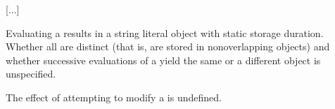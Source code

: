 \documentclass{wg21}
\begin{document}
%
%
%
%

[...]

%
%
%


\pnum
Evaluating a  results in a string literal object
with static storage duration.
%
Whether all  are distinct (that is, are stored in
nonoverlapping objects) and whether successive evaluations of a
 yield the same or a different object is
unspecified.
\begin{note}
    The effect of attempting to modify a  is undefined.
\end{note}
\end{document}
